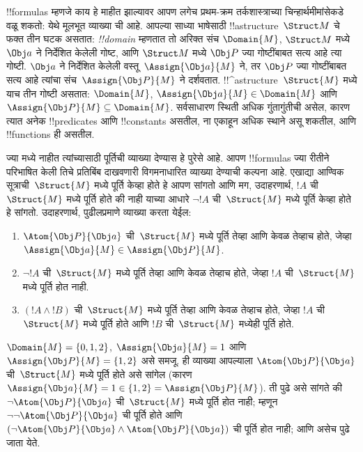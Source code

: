 \documentclass[../../../include/open-logic-section]{subfiles}
\begin{document}


!!{formula}s म्हणजे काय हे माहीत झाल्यावर आपण लगेच प्रथम-क्रम
तर्कशास्त्राच्या चिन्हार्थमीमांसेकडे वळू शकतो: येथे मूलभूत व्याख्या
ची आहे. आपल्या साध्या भाषेसाठी !!a{structure}~$\Struct M$
चे फक्त तीन घटक असतात: \emph{!!{domain}} म्हणतात तो अरिक्त संच
$\Domain{M}$, $\Struct M$ मध्ये $\Obj a$ ने निर्देशित केलेली गोष्ट, आणि
$\Struct M$ मध्ये $\Obj P$ ज्या गोष्टींबाबत सत्य आहे त्या गोष्टी.
$\Obj a$ ने निर्देशित केलेली वस्तू~$\Assign{\Obj a}{M}$ ने, तर
$\Obj P$ ज्या गोष्टींबाबत सत्य आहे त्यांचा संच~$\Assign{\Obj P}{M}$ ने
दर्शवतात. !!^a{structure}~$\Struct{M}$ मध्ये याच तीन गोष्टी असतात:
$\Domain{M}$, $\Assign{\Obj a}{M} \in \Domain{M}$ आणि
$\Assign{\Obj P}{M} \subseteq \Domain{M}$. सर्वसाधारण स्थिती अधिक
गुंतागुंतीची असेल, कारण त्यात अनेक !!{predicate}s आणि !!{constant}s
असतील, ना एकाहून अधिक स्थाने असू शकतील, आणि
!!{function}s ही असतील.
%

ज्या मध्ये नाहीत त्यांच्यासाठी पूर्तिची
व्याख्या देण्यास हे पुरेसे आहे. आपण !!{formula}s ज्या रीतीने परिभाषित
केली तिचे प्रतिबिंब दाखवणारी विगमनाधारित व्याख्या देण्याची कल्पना आहे.
एखाद्या आण्विक सूत्राची~$\Struct{M}$ मध्ये पूर्ति केव्हा होते हे आपण
सांगतो आणि मग, उदाहरणार्थ, $!A$ ची~$\Struct{M}$ मध्ये पूर्ति होते की
नाही याच्या आधारे $\lnot !A$ ची~$\Struct{M}$ मध्ये पूर्ति केव्हा होते
हे सांगतो. उदाहरणार्थ, पुढीलप्रमाणे व्याख्या करता येईल:
\begin{enumerate}
  \item $\Atom{\Obj P}{\Obj a}$ ची~$\Struct{M}$ मध्ये पूर्ति तेव्हा आणि
  केवळ तेव्हाच होते, जेव्हा $\Assign{\Obj a}{M} \in \Assign{\Obj P}{M}$.
  \item $\lnot !A$ ची~$\Struct{M}$ मध्ये पूर्ति तेव्हा आणि केवळ तेव्हाच
  होते, जेव्हा $!A$ ची~$\Struct{M}$ मध्ये पूर्ति होत नाही.
  \item $(!A \land !B)$ ची~$\Struct{M}$ मध्ये पूर्ति तेव्हा आणि केवळ
  तेव्हाच होते, जेव्हा $!A$ ची~$\Struct{M}$ मध्ये पूर्ति होते आणि
  $!B$ ची~$\Struct{M}$ मध्येही पूर्ति होते.
\end{enumerate}
$\Domain{M} = \{0, 1, 2\}$, $\Assign{\Obj a}{M} = 1$ आणि
$\Assign{\Obj P}{M} = \{1, 2\}$ असे समजू. ही व्याख्या आपल्याला
$\Atom{\Obj P}{\Obj a}$ ची~$\Struct{M}$ मध्ये पूर्ति होते असे सांगेल
(कारण $\Assign{\Obj a}{M} =  1 \in \{1,2\} = \Assign{\Obj P}{M}$).
ती पुढे असे सांगते की $\lnot \Atom{\Obj P}{\Obj a}$ ची~$\Struct{M}$
मध्ये पूर्ति होत नाही; म्हणून $\lnot\lnot \Atom{\Obj P}{\Obj a}$ ची
पूर्ति होते आणि $(\lnot \Atom{\Obj P}{\Obj a} \land \Atom{\Obj P}{\Obj a})$
ची पूर्ति होत नाही; आणि असेच पुढे जाता येते.
\end{document}
